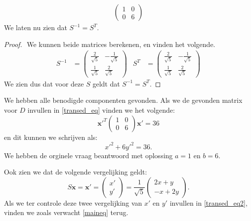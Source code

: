\documentclass[12pt, dutch, a4paper]{article}
\theoremstyle{definition}
\begin{document}
\begin{enumerate}
\begin{align}
\begin{pmatrix}
            1 & 0 \\
            0 & 6
        \end{pmatrix} 
    \end{align}   
    We laten nu zien dat $S^{-1} = S^T$.
    \begin{proof} $ $ \newline
        We kunnen beide matrices berekenen, en vinden het volgende.
        \begin{align}
            S^{-1} &= 
            \begin{pmatrix}
                \frac{2}{\sqrt{5}} & -\frac{1}{\sqrt{5}} \\
                \frac{1}{\sqrt{5}} & \frac{2}{\sqrt{5}}
            \end{pmatrix} & 
            S^T &= 
            \begin{pmatrix}
                \frac{2}{\sqrt{5}} & -\frac{1}{\sqrt{5}} \\
                \frac{1}{\sqrt{5}} & \frac{2}{\sqrt{5}}
            \end{pmatrix} 
        \end{align}
        We zien dus dat voor deze $S$ geldt dat $S^{-1} = S^T$.

    \end{proof}
    
    We hebben alle benodigde componenten gevonden. Als we de gevonden matrix voor $D$ invullen in \cref{transed_eq} vinden we het volgende:
    \begin{equation}
        \mathbf{x'}^T 
        \begin{pmatrix}
            1 & 0 \\
            0 & 6
        \end{pmatrix} 
        \mathbf{x'} = 36
    \end{equation}
    en dit kunnen we schrijven als:
    \begin{equation} \label{transed_eq2}
        {x'}^2 + 6{y'}^2 = 36.
    \end{equation}
    We hebben de orginele vraag beantwoord met oplossing $a = 1$ en $b = 6$.

    Ook zien we dat de volgende vergelijking geldt: 
    \begin{equation}
        S\mathbf{x} = 
        \mathbf{x'} = 
        \begin{pmatrix}
            x' \\
            y'
        \end{pmatrix}
        = \frac{1}{\sqrt{5}}
        \begin{pmatrix}
            2x + y \\
            -x + 2y
        \end{pmatrix}.
    \end{equation}
    Als we ter controle deze twee vergelijking van $x'$ en $y'$ invullen in \cref{transed_eq2}, vinden we zoals verwacht \cref{maineq} terug.


\end{enumerate}
\end{document}
